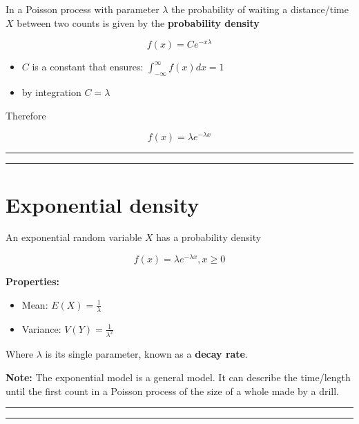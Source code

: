 \documentclass[
]{book}
\providecommand{\tightlist}{%
  \setlength{\itemsep}{0pt}\setlength{\parskip}{0pt}}
\begin{document}
In a Poisson process with parameter \(\lambda\) the probability of waiting a distance/time \(X\) between two counts is given by the \textbf{probability density}

\[f(x)= C e^{-x\lambda}\]

\begin{itemize}
\item
  \(C\) is a constant that ensures: \(\int_{-\infty}^{\infty} f(x) dx =1\)
\item
  by integration \(C=\lambda\)
\end{itemize}

Therefore

\[f(x)=\lambda e^{-\lambda x}\]

\begin{center}\rule{0.5\linewidth}{0.5pt}\end{center}

\begin{center}\rule{0.5\linewidth}{0.5pt}\end{center}

\hypertarget{exponential-density-3}{%
\section{Exponential density}\label{exponential-density-3}}

An exponential random variable \(X\) has a probability density

\[f(x)=\lambda e^{-\lambda x}, x\geq 0\]

\textbf{Properties:}

\begin{itemize}
\tightlist
\item
  Mean: \(E(X)=\frac{1}{\lambda}\)
\item
  Variance: \(V(Y)=\frac{1}{\lambda^2}\)
\end{itemize}

Where \(\lambda\) is its single parameter, known as a \textbf{decay rate}.

\textbf{Note:} The exponential model is a general model. It can describe the time/length until the first count in a Poisson process of the size of a whole made by a drill.

\begin{center}\rule{0.5\linewidth}{0.5pt}\end{center}

\begin{center}\rule{0.5\linewidth}{0.5pt}\end{center}
\end{document}
